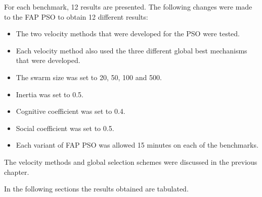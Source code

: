 For each benchmark, 12 results are presented. The following changes were made to the FAP PSO to obtain 12 different results:
\begin{itemize}
\item The two velocity methods that were developed for the PSO were tested.
\item Each velocity method also used the three different global best mechanisms that were developed.
\item The swarm size was set to 20, 50, 100 and 500.
\item Inertia was set to 0.5.
\item Cognitive coefficient was set to 0.4.
\item Social coefficient was set to 0.5.
\item Each variant of FAP PSO was allowed 15 minutes on each of the benchmarks.
\end{itemize}
The velocity methods and global selection schemes were discussed in the previous chapter.

In the following sections the results obtained are tabulated.
